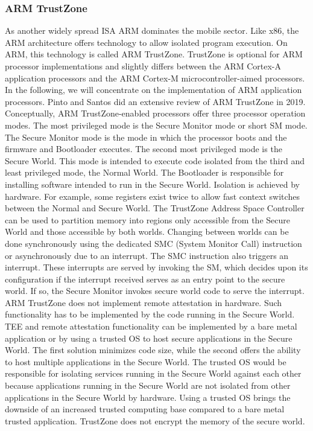 \subsubsection{ARM TrustZone}
\label{sec:20:trustzone}
As another widely spread ISA ARM dominates the mobile sector. Like x86, the ARM
architecture offers technology to allow isolated program execution. On ARM, this
technology is called ARM TrustZone. TrustZone is optional for ARM processor
implementations and slightly differs between the ARM Cortex-A application
processors and the ARM Cortex-M microcontroller-aimed processors. In the
following, we will concentrate on the implementation of ARM application
processors. Pinto and Santos did an extensive review of ARM TrustZone in
2019.\cite{pinto_demystifying_2019} Conceptually, ARM TrustZone-enabled
processors offer three processor operation modes. The most privileged mode is
the Secure Monitor mode or short SM mode. The Secure Monitor mode is the mode in
which the processor boots and the firmware and Bootloader executes. The second
most privileged mode is the Secure World. This mode is intended to execute code
isolated from the third and least privileged mode, the Normal World. The
Bootloader is responsible for installing software intended to run in the Secure
World. Isolation is achieved by hardware. For example, some registers exist
twice to allow fast context switches between the Normal and Secure World. The
TrustZone Address Space Controller can be used to partition memory into regions
only accessible from the Secure World and those accessible by both worlds.
Changing between worlds can be done synchronously using the dedicated SMC
(System Monitor Call) instruction or asynchronously due to an interrupt. The SMC
instruction also triggers an interrupt. These interrupts are served by invoking
the SM, which decides upon its configuration if the interrupt received serves as
an entry point to the secure world. If so, the Secure Monitor invokes secure
world code to serve the interrupt.\\

ARM TrustZone does not implement remote attestation in hardware. Such
functionality has to be implemented by the code running in the Secure World. TEE
and remote attestation functionality can be implemented by a bare metal
application or by using a trusted OS to host secure applications in the Secure
World. The first solution minimizes code size, while the second offers the
ability to host multiple applications in the Secure World. The trusted OS would
be responsible for isolating services running in the Secure World against each
other because applications running in the Secure World are not isolated from
other applications in the Secure World by hardware. Using a trusted OS brings
the downside of an increased trusted computing base compared to a bare metal
trusted application. TrustZone does not encrypt the memory of the secure
world.\\

